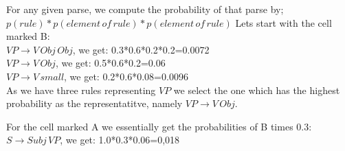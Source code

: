 \documentclass[12pt]{article}
\newenvironment{answer}[2][Answer]{\begin{trivlist}
\item[\hskip \labelsep {\bfseries #1}\hskip \labelsep {\bfseries #2:}]}{\end{trivlist}}
\begin{document}
\begin{answer}{a)}

For any given parse, we compute the probability of that parse by; $p(rule)*p(element\, of \, rule)*p(element \, of \, rule)$
Lets start with the cell marked B: \\
$VP \to V \, Obj \, Obj$, we get: 0.3*0.6*0.2*0.2=0.0072 \\
$VP \to V \, Obj$, we get: 0.5*0.6*0.2=0.06 \\
$VP \to V \, small$, we get: 0.2*0.6*0.08=0.0096 \\
As we have three rules representing $VP$ we select the one which has the highest probability as the representatitve, namely $VP \to V \, Obj$.

For the cell marked A we essentially get the probabilities of B times 0.3: \\
$S \to Subj \, VP$, we get: 1.0*0.3*0.06=0,018 \\


\end{answer}
\end{document}
